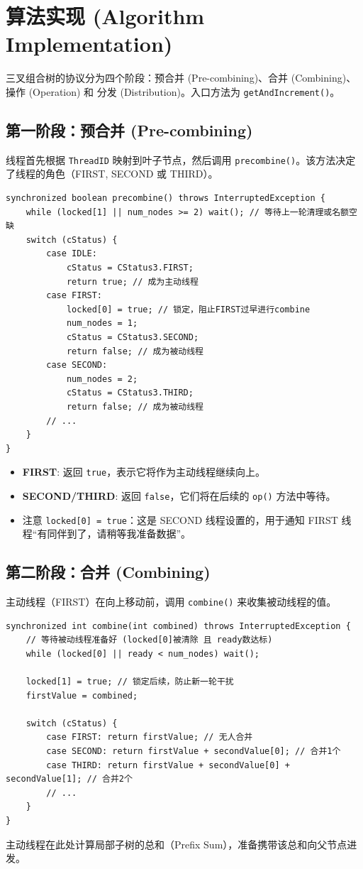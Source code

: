 \documentclass[UTF8,a4paper,12pt]{ctexart}
\begin{document}
\section{算法实现 (Algorithm Implementation)}

三叉组合树的协议分为四个阶段：预合并 (Pre-combining)、合并 (Combining)、操作 (Operation) 和 分发 (Distribution)。入口方法为 \texttt{getAndIncrement()}。

\subsection{第一阶段：预合并 (Pre-combining)}
线程首先根据 \texttt{ThreadID} 映射到叶子节点，然后调用 \texttt{precombine()}。该方法决定了线程的角色（FIRST, SECOND 或 THIRD）。

\begin{lstlisting}
synchronized boolean precombine() throws InterruptedException {
    while (locked[1] || num_nodes >= 2) wait(); // 等待上一轮清理或名额空缺
    switch (cStatus) {
        case IDLE:
            cStatus = CStatus3.FIRST;
            return true; // 成为主动线程
        case FIRST:
            locked[0] = true; // 锁定，阻止FIRST过早进行combine
            num_nodes = 1;
            cStatus = CStatus3.SECOND;
            return false; // 成为被动线程
        case SECOND:
            num_nodes = 2;
            cStatus = CStatus3.THIRD;
            return false; // 成为被动线程
        // ...
    }
}
\end{lstlisting}
\begin{itemize}
    \item \textbf{FIRST}: 返回 \texttt{true}，表示它将作为主动线程继续向上。
    \item \textbf{SECOND/THIRD}: 返回 \texttt{false}，它们将在后续的 \texttt{op()} 方法中等待。
    \item 注意 \texttt{locked[0] = true}：这是 SECOND 线程设置的，用于通知 FIRST 线程“有同伴到了，请稍等我准备数据”。
\end{itemize}

\subsection{第二阶段：合并 (Combining)}
主动线程（FIRST）在向上移动前，调用 \texttt{combine()} 来收集被动线程的值。

\begin{lstlisting}
synchronized int combine(int combined) throws InterruptedException {
    // 等待被动线程准备好 (locked[0]被清除 且 ready数达标)
    while (locked[0] || ready < num_nodes) wait(); 
    
    locked[1] = true; // 锁定后续，防止新一轮干扰
    firstValue = combined;
    
    switch (cStatus) {
        case FIRST: return firstValue; // 无人合并
        case SECOND: return firstValue + secondValue[0]; // 合并1个
        case THIRD: return firstValue + secondValue[0] + secondValue[1]; // 合并2个
        // ...
    }
}
\end{lstlisting}
主动线程在此处计算局部子树的总和（Prefix Sum），准备携带该总和向父节点进发。
\end{document}
